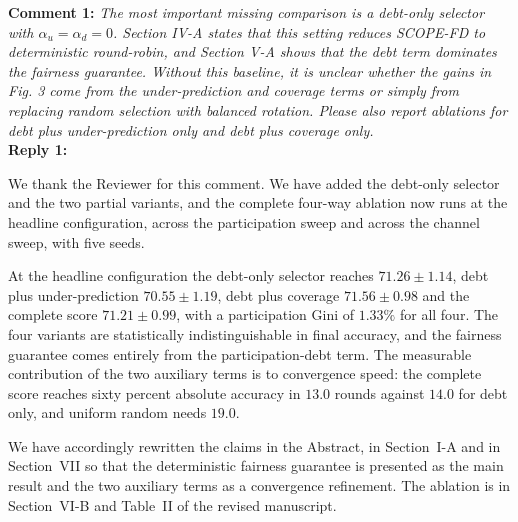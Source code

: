 \documentclass[10pt]{article}
\begin{document}

\noindent
\textbf{Comment 1:} \textit{The most important missing comparison is a debt-only selector with $\alpha_u = \alpha_d = 0$. Section IV-A states that this setting reduces SCOPE-FD to deterministic round-robin, and Section V-A shows that the debt term dominates the fairness guarantee. Without this baseline, it is unclear whether the gains in Fig. 3 come from the under-prediction and coverage terms or simply from replacing random selection with balanced rotation. Please also report ablations for debt plus under-prediction only and debt plus coverage only.} \\
\noindent
\textbf{Reply 1:} {We thank the Reviewer for this comment. We have added the debt-only selector and the two partial variants, and the complete four-way ablation now runs at the headline configuration, across the participation sweep and across the channel sweep, with five seeds.

At the headline configuration the debt-only selector reaches $71.26 \pm 1.14$, debt plus under-prediction $70.55 \pm 1.19$, debt plus coverage $71.56 \pm 0.98$ and the complete score $71.21 \pm 0.99$, with a participation Gini of $1.33\%$ for all four. The four variants are statistically indistinguishable in final accuracy, and the fairness guarantee comes entirely from the participation-debt term. The measurable contribution of the two auxiliary terms is to convergence speed: the complete score reaches sixty percent absolute accuracy in $13.0$ rounds against $14.0$ for debt only, and uniform random needs $19.0$.

We have accordingly rewritten the claims in the Abstract, in Section~I-A and in Section~VII so that the deterministic fairness guarantee is presented as the main result and the two auxiliary terms as a convergence refinement. The ablation is in Section~VI-B and Table~II of the revised manuscript.}\\
\end{document}
